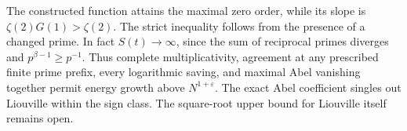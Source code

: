 The constructed function attains the maximal zero order, while its
slope is $\zeta(2)G(1)>\zeta(2)$. The strict inequality follows from
the presence of a changed prime. In fact $S(t)\to\infty$, since the
sum of reciprocal primes diverges and $p^{\beta-1}\ge p^{-1}$.
Thus complete multiplicativity, agreement at any prescribed finite
prime prefix, every logarithmic saving, and maximal Abel vanishing
together permit energy growth above $N^{1+\varepsilon}$. The exact
Abel coefficient singles out Liouville within the sign class. The
square-root upper bound for Liouville itself remains open.
